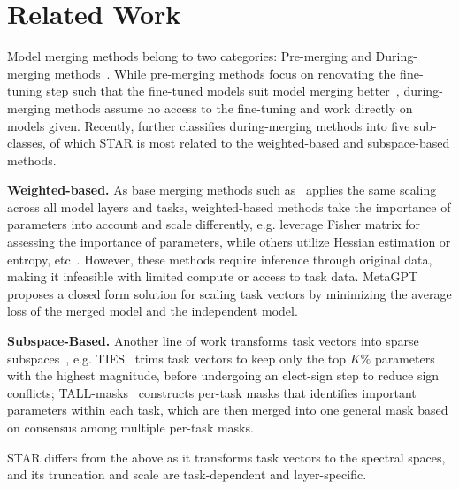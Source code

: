 \section{Related Work}
Model merging methods belong to two categories: Pre-merging and During-merging methods~\cite{yang2024model}. While pre-merging methods focus on renovating the fine-tuning step such that the fine-tuned models suit model merging better~\cite{ortiz2024task,imfeld2023transformer,guerrero2022re}, during-merging methods assume no access to the fine-tuning and work directly on models given. Recently, \citet{yang2024model} further classifies during-merging methods into five sub-classes,
of which STAR is most related to the weighted-based and subspace-based methods.

\noindent\textbf{Weighted-based.}
As base merging methods such as~\citet{ilharco2022editing} applies the same scaling across all model layers and tasks, weighted-based methods take the importance of parameters into account and scale differently, e.g. \citet{matena2022merging,tam2024merging} leverage Fisher matrix for assessing the importance of parameters, while others utilize Hessian estimation or entropy, etc~\cite{daheim2023model,yang2023adamerging}. 
However, these methods require inference through original data, making it infeasible with limited compute or access to task data.
MetaGPT~\cite{zhou2024metagpt} proposes a closed form solution for scaling task vectors by minimizing the average loss of the merged model and the independent model.  

\noindent\textbf{Subspace-Based.} Another line of work transforms task vectors into sparse subspaces~\cite{davari2023model,yadav2024ties,wang2024localizing, huang2024emr},
e.g. TIES~\cite{yadav2024ties} trims task vectors to keep only the top \(K\%\) parameters with the highest magnitude, before undergoing an elect-sign step to reduce sign conflicts; TALL-masks~\cite{wang2024localizing} constructs per-task masks that identifies important parameters within each task, which are then merged into one general mask based on consensus among multiple per-task masks.

STAR differs from the above as it transforms task vectors to the spectral spaces, and its truncation and scale are task-dependent and layer-specific.